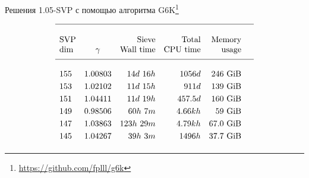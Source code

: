 \documentclass[usenames,dvipsnames, 9pt]{beamer}
\begin{document}
\begin{frame}{Решения 1.05-SVP с помощью алгоритма G6K\footnote{\url{https://github.com/fplll/g6k}} }
\newcommand{\GiB}{~\text{GiB}}
\Large
\begin{table}[t!]
	{\centering 
		\[
		\begin{array}{l@{\hskip 1em} c@{\hskip 1em} r@{\hskip 1em}r@{\hskip 1em}r@{\hskip 1em}c}
		\hline \\ [1pt]
		\text{SVP} &  & \text{Sieve} & \text{Total} &  \text{Memory} & \\
		\text{dim} &\Huge \gamma &  \text{Wall time} & \text{CPU time} & \text{usage}  \\[5pt]
		\hline \\
		155 &   1.00803 &   14d~16h  &  1056d   &   246 \GiB \\[3pt]
		153 &   1.02102 &   11d~15h  &  911d   &   139 \GiB  \\ [3pt]
		151 &   1.04411 &   11d~19h   &  457.5d &  160 \GiB   \\ [3pt]
		149 &   0.98506 &   60h~7m     &  4.66kh    &  59 \GiB  \\ [3pt]
		147 &   1.03863 &   123h~29m   &  4.79kh   &  67.0 \GiB  \\ [3pt]
		145 &   1.04267 &   39h~3m     &  1496h    & 37.7 \GiB  \\ [3pt]
		\end{array}
		\]
	}
\end{table}
\end{frame}
\end{document}
